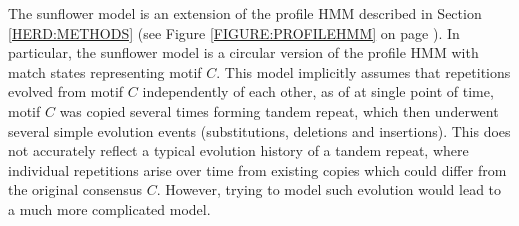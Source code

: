 The sunflower model is an extension of the profile HMM described in Section
\ref{HERD:METHODS} (see Figure \ref{FIGURE:PROFILEHMM} on page
\pageref{FIGURE:PROFILEHMM}). In particular, the sunflower model is a circular
version of the profile HMM with match states representing motif $C$. This model
implicitly assumes that repetitions evolved from motif $C$ independently of
each other, as of at single point of time, motif $C$ was copied several times
forming tandem repeat, which then underwent several simple evolution events 
(substitutions, deletions and insertions). This does not accurately reflect a
typical evolution history of a tandem repeat, where individual repetitions
arise over time from existing copies which could differ from the original
consensus $C$. However, trying to model such evolution would lead to a much
more complicated model.

